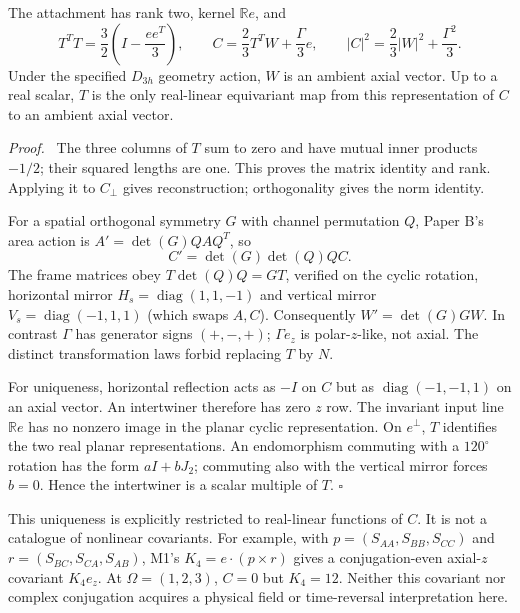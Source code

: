\documentclass[11pt,a4paper]{article}
\newenvironment{proof}{\par\textit{Proof.}\ }{\hfill$\square$\par}
\newcommand{\R}{\mathbb R}\newcommand{\C}{\mathbb C}\newcommand{\Om}{\Omega}\newcommand{\Fh}{\widehat F}\newcommand{\cof}{\operatorname{cof}}\newcommand{\diag}{\operatorname{diag}}\newcommand{\Argz}{\operatorname{Arg}_0}\newcommand{\iu}{\mathrm i}\newcommand{\dd}{\mathrm d}
\begin{document}
\begin{proposition}\label{prop:attach}
The attachment has rank two, kernel $\R e$, and
\begin{equation}
 T^TT=\frac32\left(I-\frac{ee^T}{3}\right),\qquad
 C=\frac23T^TW+\frac{\Gamma}{3}e,\qquad
 |C|^2=\frac23|W|^2+\frac{\Gamma^2}{3}.\label{eq:reconstruct}
\end{equation}
Under the specified $D_{3h}$ geometry action, $W$ is an ambient axial vector. Up to a real scalar, $T$ is the only real-linear equivariant map from this representation of $C$ to an ambient axial vector.
\end{proposition}
\begin{proof}
The three columns of $T$ sum to zero and have mutual inner products $-1/2$; their squared lengths are one. This proves the matrix identity and rank. Applying it to $C_\perp$ gives reconstruction; orthogonality gives the norm identity.

For a spatial orthogonal symmetry $G$ with channel permutation $Q$, Paper B's area action is $A'=\det(G)QAQ^T$, so
\begin{equation}
 C'=\det(G)\det(Q)QC.\label{eq:Ccov}
\end{equation}
The frame matrices obey $T\det(Q)Q=GT$, verified on the cyclic rotation, horizontal mirror $H_s=\diag(1,1,-1)$ and vertical mirror $V_s=\diag(-1,1,1)$ (which swaps $A,C$). Consequently $W'=\det(G)GW$. In contrast $\Gamma$ has generator signs $(+,-,+)$; $\Gamma e_z$ is polar-$z$-like, not axial. The distinct transformation laws forbid replacing $T$ by $N$.

For uniqueness, horizontal reflection acts as $-I$ on $C$ but as $\diag(-1,-1,1)$ on an axial vector. An intertwiner therefore has zero $z$ row. The invariant input line $\R e$ has no nonzero image in the planar cyclic representation. On $e^\perp$, $T$ identifies the two real planar representations. An endomorphism commuting with a $120^\circ$ rotation has the form $aI+bJ_2$; commuting also with the vertical mirror forces $b=0$. Hence the intertwiner is a scalar multiple of $T$.
\end{proof}

This uniqueness is explicitly restricted to real-linear functions of $C$. It is not a catalogue of nonlinear covariants. For example, with $p=(S_{AA},S_{BB},S_{CC})$ and $r=(S_{BC},S_{CA},S_{AB})$, M1's $K_4=e\cdot(p\times r)$ gives a conjugation-even axial-$z$ covariant $K_4e_z$. At $\Om=(1,2,3)$, $C=0$ but $K_4=12$. Neither this covariant nor complex conjugation acquires a physical field or time-reversal interpretation here.
\end{document}
